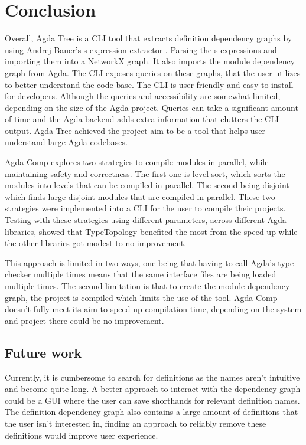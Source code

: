 
\chapter{Conclusion}

Overall, Agda Tree is a CLI tool that extracts definition dependency graphs by
using Andrej Bauer's s-expression extractor \cite{andrej}. Parsing the
s-expressions and importing them into a NetworkX graph. It also imports the
module dependency graph from Agda. The CLI exposes queries on these graphs,
that the user utilizes to better understand the code base. The CLI is
user-friendly and easy to install for developers. Although the queries and
accessibility are somewhat limited, depending on the size of the Agda project.
Queries can take a significant amount of time and the Agda backend adds extra
information that clutters the CLI output. Agda Tree achieved the project aim to
be a tool that helps user understand large Agda codebases.

Agda Comp explores two strategies to compile modules in parallel, while
maintaining safety and correctness. The first one is level sort, which sorts
the modules into levels that can be compiled in parallel. The second being
disjoint which finds large disjoint modules that are compiled in parallel.
These two strategies were implemented into a CLI for the user to compile their
projects. Testing with these strategies using different parameters, across
different Agda libraries, showed that TypeTopology benefited the most from the
speed-up while the other libraries got modest to no improvement.

This approach is limited in two ways, one being that having to call Agda's type
checker multiple times means that the same interface files are being loaded
multiple times. The second limitation is that to create the module dependency
graph, the project is compiled which limits the use of the tool. Agda Comp
doesn't fully meet its aim to speed up compilation time, depending on the
system and project there could be no improvement.

\section{Future work}

Currently, it is cumbersome to search for definitions as the names aren't
intuitive and become quite long. A better approach to interact with the
dependency graph could be a GUI where the user can save shorthands for relevant
definition names. The definition dependency graph also contains a large amount
of definitions that the user isn't interested in, finding an approach to
reliably remove these definitions would improve user experience.


